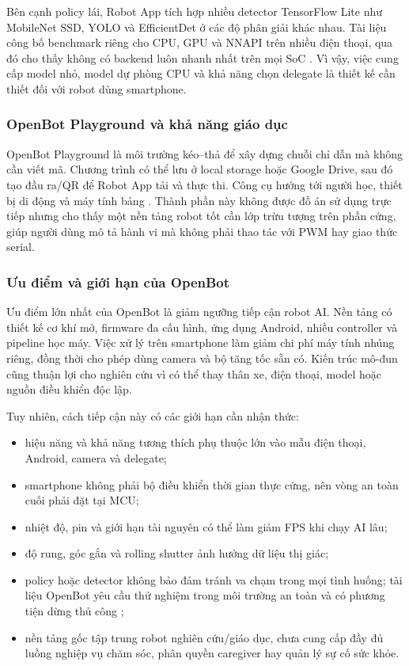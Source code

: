 Bên cạnh policy lái, Robot App tích hợp nhiều detector TensorFlow Lite như MobileNet SSD, YOLO và EfficientDet ở các độ phân giải khác nhau. Tài liệu công bố benchmark riêng cho CPU, GPU và NNAPI trên nhiều điện thoại, qua đó cho thấy không có backend luôn nhanh nhất trên mọi SoC . Vì vậy, việc cung cấp model nhỏ, model dự phòng CPU và khả năng chọn delegate là thiết kế cần thiết đối với robot dùng smartphone.

\subsubsection{OpenBot Playground và khả năng giáo dục}

OpenBot Playground là môi trường kéo--thả để xây dựng chuỗi chỉ dẫn mà không cần viết mã. Chương trình có thể lưu ở local storage hoặc Google Drive, sau đó tạo đầu ra/QR để Robot App tải và thực thi. Công cụ hướng tới người học, thiết bị di động và máy tính bảng . Thành phần này không được đồ án sử dụng trực tiếp nhưng cho thấy một nền tảng robot tốt cần lớp trừu tượng trên phần cứng, giúp người dùng mô tả hành vi mà không phải thao tác với PWM hay giao thức serial.

\subsubsection{Ưu điểm và giới hạn của OpenBot}

Ưu điểm lớn nhất của OpenBot là giảm ngưỡng tiếp cận robot AI. Nền tảng có thiết kế cơ khí mở, firmware đa cấu hình, ứng dụng Android, nhiều controller và pipeline học máy. Việc xử lý trên smartphone làm giảm chi phí máy tính nhúng riêng, đồng thời cho phép dùng camera và bộ tăng tốc sẵn có. Kiến trúc mô-đun cũng thuận lợi cho nghiên cứu vì có thể thay thân xe, điện thoại, model hoặc nguồn điều khiển độc lập.

Tuy nhiên, cách tiếp cận này có các giới hạn cần nhận thức:

\begin{itemize}
    \item hiệu năng và khả năng tương thích phụ thuộc lớn vào mẫu điện thoại, Android, camera và delegate;
    \item smartphone không phải bộ điều khiển thời gian thực cứng, nên vòng an toàn cuối phải đặt tại MCU;
    \item nhiệt độ, pin và giới hạn tài nguyên có thể làm giảm FPS khi chạy AI lâu;
    \item độ rung, góc gắn và rolling shutter ảnh hưởng dữ liệu thị giác;
    \item policy hoặc detector không bảo đảm tránh va chạm trong mọi tình huống; tài liệu OpenBot yêu cầu thử nghiệm trong môi trường an toàn và có phương tiện dừng thủ công ;
    \item nền tảng gốc tập trung robot nghiên cứu/giáo dục, chưa cung cấp đầy đủ luồng nghiệp vụ chăm sóc, phân quyền caregiver hay quản lý sự cố sức khỏe.
\end{itemize}

